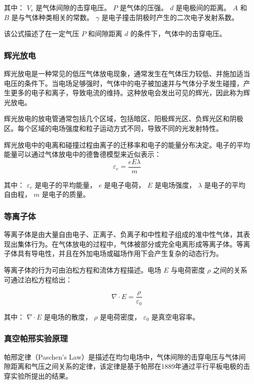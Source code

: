 \documentclass[dvipsnames, svgnames,a4paper,11pt]{article}
\begin{document}
			其中：
			 \( V_s \) 是气体间隙的击穿电压。
			\( P \) 是气体的压强。
			 \( d \) 是电极间的距离。
			 \( A \) 和 \( B \) 是与气体种类相关的常数。
			 \( \gamma \) 是电子撞击阴极时产生的二次电子发射系数。
			
			该公式描述了在一定气压 \( P \) 和间隙距离 \( d \) 的条件下，气体中的击穿电压。
		

			\subsubsection{辉光放电}
			辉光放电是一种常见的低压气体放电现象，通常发生在气体压力较低、并施加适当电压的条件下。当电场足够强时，气体中的电子被加速并与气体分子发生碰撞，产生更多的电子和离子，导致电流的维持。这种放电会发出可见的辉光，因此称为辉光放电。
			
			辉光放电的放电管通常包括几个区域，包括暗区、阳极辉光区、负辉光区和阴极区。每个区域的电场强度和粒子运动方式不同，导致不同的光发射特性。
			
			辉光放电中的电离和碰撞过程由离子的迁移率和电子的能量分布决定。电子的平均能量可以通过气体放电中的德鲁德模型来近似表示：
			\[
			\varepsilon_e = \frac{eE\lambda}{m}
			\]
			
			其中：
			 \( \varepsilon_e \) 是电子的平均能量，
			 \( e \) 是电子电荷，
			 \( E \) 是电场强度，
			 \( \lambda \) 是电子的平均自由程，
			 \( m \) 是电子的质量。
			
			\subsubsection{等离子体}
			等离子体是由大量自由电子、正离子、负离子和中性粒子组成的准中性气体，其表现出集体行为。在气体放电的过程中，气体被部分或完全电离形成等离子体。等离子体具有导电性，并且在外加电场或磁场作用下会产生复杂的动态行为。
			
			等离子体的行为可由泊松方程和流体方程描述。电场 \( E \) 与电荷密度 \( \rho \) 之间的关系可通过泊松方程给出：
			
			\[
			\nabla \cdot E = \frac{\rho}{\varepsilon_0}
			\]
			
			其中：
			 \( \nabla \cdot E \) 是电场的散度，
			 \( \rho \) 是电荷密度，
			 \( \varepsilon_0 \) 是真空电容率。

		\subsubsection{真空帕邢实验原理}
		帕邢定律（Paschen's Law）是描述在均匀电场中，气体间隙的击穿电压与气体间隙距离和气压之间关系的定律，该定律是基于帕邢在1889年通过平行平板电极的击穿实验所提出的结果。
\end{document}
